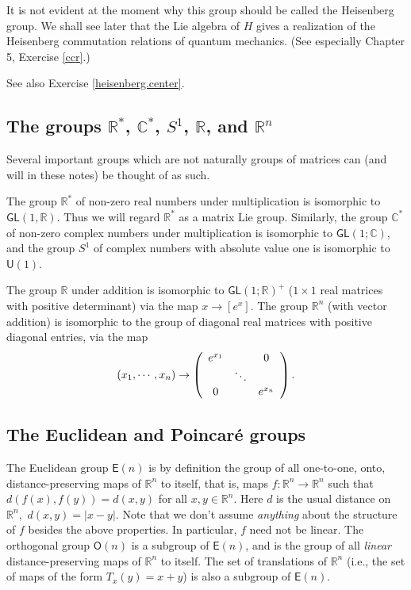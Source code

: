 \documentclass{amsbook}
\theoremstyle{plain}
\numberwithin{equation}{chapter}
\numberwithin{theorem}{chapter}
\begin{document}
It is not evident at the moment why this group should be called the Heisenberg
group. We shall see later that the Lie algebra of $H$ gives a realization of
the Heisenberg commutation relations of quantum mechanics. (See especially
Chapter 5, Exercise \ref{ccr}.)

See also Exercise \ref{heisenberg.center}.

\subsection{The groups $\mathbb{R}^{\ast}$, $\mathbb{C}^{\ast}$, $S^{1}$,
$\mathbb{R}$, and $\mathbb{R}^{n}$}

Several important groups which are not naturally groups of matrices can (and
will in these notes) be thought of as such.

The group $\mathbb{R}^{*}$ of non-zero real numbers under multiplication is
isomorphic to $\mathsf{GL}(1,\mathbb{R})$. Thus we will regard $\mathbb{R}%
^{*}$ as a matrix Lie group. Similarly, the group $\mathbb{C}^{*}$ of non-zero
complex numbers under multiplication is isomorphic to $\mathsf{GL}%
(1;\mathbb{C})$, and the group $S^{1}$ of complex numbers with absolute value
one is isomorphic to $\mathsf{U}(1)$.

The group $\mathbb{R}$ under addition is isomorphic to $\mathsf{GL}%
(1;\mathbb{R})^{+}$ ($1\times1$ real matrices with positive determinant) via
the map $x\rightarrow\left[  e^{x}\right]  $. The group $\mathbb{R}^{n}$ (with
vector addition) is isomorphic to the group of diagonal real matrices with
positive diagonal entries, via the map
\[
(x_{1},\cdots,x_{n})\rightarrow\left(
\begin{array}
[c]{ccc}%
e^{x_{1}} &  & 0\\
& \ddots & \\
0 &  & e^{x_{n}}%
\end{array}
\right)  \text{.}%
\]

\subsection{The Euclidean and Poincar\'{e} groups}

The Euclidean group $\mathsf{E}(n)$ is by definition the group of all
one-to-one, onto, distance-preserving maps of $\mathbb{R}^{n}$ to itself, that
is, maps $f:\mathbb{R}^{n}\rightarrow\mathbb{R}^{n}$ such that $d\left(
f\left(  x\right)  ,f\left(  y\right)  \right)  =d\left(  x,y\right)  $ for
all $x,y\in\mathbb{R}^{n}.$ Here $d$ is the usual distance on $\mathbb{R}%
^{n},$ $d\left(  x,y\right)  =\left|  x-y\right|  .$ Note that we don't assume
\textit{anything} about the structure of $f$ besides the above properties. In
particular, $f$ need not be linear. The orthogonal group $\mathsf{O}(n)$ is a
subgroup of $\mathsf{E}(n)$, and is the group of all \textit{linear}
distance-preserving maps of $\mathbb{R}^{n}$ to itself. The set of
translations of $\mathbb{R}^{n}$ (i.e., the set of maps of the form
$T_{x}(y)=x+y$) is also a subgroup of $\mathsf{E}(n)$.
\end{document}
